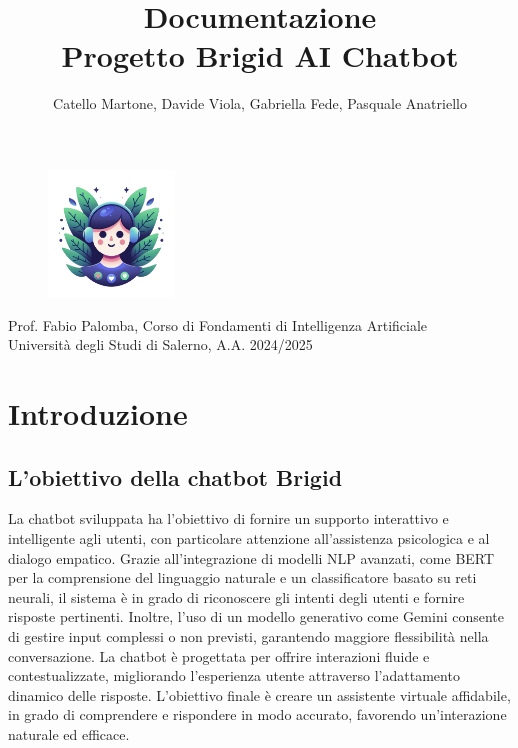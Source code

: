 \documentclass[12pt, letterpaper]{article}
\title{\Huge \textbf{Documentazione}\\[0.5cm]
\Large \textbf{Progetto Brigid AI Chatbot}}
\author{\large Catello Martone, Davide Viola, Gabriella Fede, Pasquale Anatriello}
\begin{document}
	
\begin{figure}[t]
\centering
\includegraphics[width=0.3\textwidth]{brigid.png}
\end{figure}
	
\maketitle
\vfill
\begin{center}
Prof. Fabio Palomba, Corso di Fondamenti di Intelligenza Artificiale\\
Università degli Studi di Salerno, A.A. 2024/2025
\end{center}
	
\newpage
\tableofcontents
\newpage
	
\section{Introduzione}	
\subsection{L'obiettivo della chatbot Brigid}
La chatbot sviluppata ha l’obiettivo di fornire un supporto interattivo e intelligente agli utenti, con particolare attenzione all'assistenza psicologica e al dialogo empatico. Grazie all’integrazione di modelli NLP avanzati, come BERT per la comprensione del linguaggio naturale e un classificatore basato su reti neurali, il sistema è in grado di riconoscere gli intenti degli utenti e fornire risposte pertinenti. Inoltre, l’uso di un modello generativo come Gemini consente di gestire input complessi o non previsti, garantendo maggiore flessibilità nella conversazione. La chatbot è progettata per offrire interazioni fluide e contestualizzate, migliorando l’esperienza utente attraverso l’adattamento dinamico delle risposte. L’obiettivo finale è creare un assistente virtuale affidabile, in grado di comprendere e rispondere in modo accurato, favorendo un’interazione naturale ed efficace.
\end{document}
